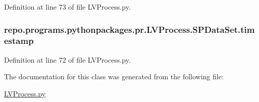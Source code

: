 Definition at line 73 of file L\-V\-Process.\-py.

\hypertarget{classrepo_1_1programs_1_1pythonpackages_1_1pr_1_1LVProcess_1_1SPDataSet_a3c864d29b91697c2cae59842b415b650}{
\subsubsection[{timestamp}]{\setlength{\rightskip}{0pt plus 5cm}repo.\-programs.\-pythonpackages.\-pr.\-L\-V\-Process.\-S\-P\-Data\-Set.\-timestamp}}\label{classrepo_1_1programs_1_1pythonpackages_1_1pr_1_1LVProcess_1_1SPDataSet_a3c864d29b91697c2cae59842b415b650}


Definition at line 72 of file L\-V\-Process.\-py.



The documentation for this class was generated from the following file\-:\begin{DoxyCompactItemize}
\item 
\hyperlink{LVProcess_8py}{L\-V\-Process.\-py}\end{DoxyCompactItemize}
